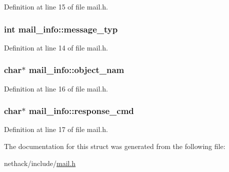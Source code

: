 Definition at line 15 of file mail.\+h.

\hypertarget{structmail__info_a05e8b112dfdcc92e6d78cd95acce6e33}{
\subsubsection[{message\+\_\+typ}]{\setlength{\rightskip}{0pt plus 5cm}int mail\+\_\+info\+::message\+\_\+typ}}\label{structmail__info_a05e8b112dfdcc92e6d78cd95acce6e33}


Definition at line 14 of file mail.\+h.

\hypertarget{structmail__info_a453d58876054570560ffbcb93668f3bf}{
\subsubsection[{object\+\_\+nam}]{ char$\ast$ mail\+\_\+info\+::object\+\_\+nam}}\label{structmail__info_a453d58876054570560ffbcb93668f3bf}


Definition at line 16 of file mail.\+h.

\hypertarget{structmail__info_ac0ac765f48a9c2ea635f3de3ac53fde0}{
\subsubsection[{response\+\_\+cmd}]{ char$\ast$ mail\+\_\+info\+::response\+\_\+cmd}}\label{structmail__info_ac0ac765f48a9c2ea635f3de3ac53fde0}


Definition at line 17 of file mail.\+h.



The documentation for this struct was generated from the following file\+:\begin{DoxyCompactItemize}
\item 
nethack/include/\hyperlink{mail_8h}{mail.\+h}\end{DoxyCompactItemize}
